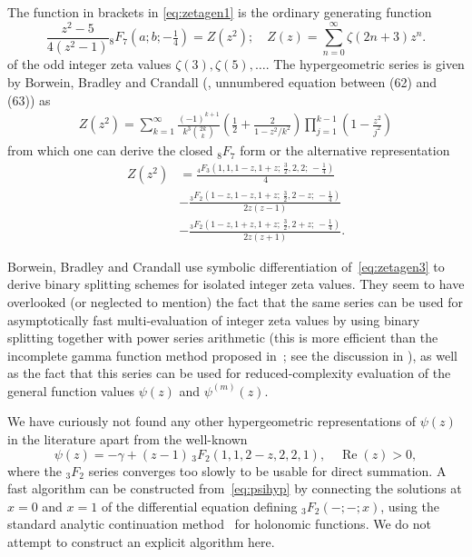 \documentclass[reqno]{amsart}
\newcommand{\Real}{\operatorname{Re}}
\theoremstyle{definition}
\begin{document}
The function in brackets in \eqref{eq:zetagen1} is
the ordinary generating function 
\begin{equation}
\frac{z^2-5}{4 (z^2-1)} {}_8F_7 ( a; b; -\tfrac{1}{4} ) = Z(z^2); \quad Z(z) = \sum_{n=0}^{\infty} \zeta(2n+3) z^n.
\label{eq:zetagen2}
\end{equation}
of the odd integer zeta values $\zeta(3), \zeta(5), \ldots$.
The hypergeometric series is given by
Borwein, Bradley and Crandall (\cite{BorweinBradleyCrandall2000}, unnumbered equation between (62) and (63))
as
\begin{align}
Z(z^2) = \sum_{k=1}^{\infty} \frac{(-1)^{k+1}}{k^3 {2k \choose k}} \left(\frac{1}{2} + \frac{2}{1-z^2/k^2}\right) \prod_{j=1}^{k-1} \left(1 - \frac{z^2}{j^2} \right)
\label{eq:zetagen3}
\end{align}
from which one can derive the closed ${}_8F_7$ form or the alternative representation
\begin{align}
Z(z^2) & = \frac{{}_4F_3(1, 1, 1-z, 1+z;\, \tfrac{3}{2}, 2, 2;\, -\tfrac{1}{4})}{4} \\
       & - \frac{{}_3F_2(1-z, 1-z, 1+z;\, \tfrac{3}{2}, 2-z;\, -\tfrac{1}{4})}{2 z (z-1)} \\
       & - \frac{{}_3F_2(1-z, 1+z, 1+z;\, \tfrac{3}{2}, 2+z;\, -\tfrac{1}{4})}{2 z (z+1)}.
\end{align}

Borwein, Bradley and Crandall use symbolic differentiation of~\eqref{eq:zetagen3}
to derive binary splitting schemes for isolated integer zeta values.
They seem to have overlooked (or neglected to mention)
the fact that the same series can be used for asymptotically fast
multi-evaluation of integer zeta values
by using binary splitting together with power series arithmetic
(this is more efficient than the incomplete gamma function method proposed in~{\cite{BorweinBradleyCrandall2000}};
see the discussion in \cite{Johansson2014thesis}),
as well as the fact that
this series can be used for reduced-complexity evaluation of the general function values $\psi(z)$ and $\psi^{(m)}(z)$.

We have curiously not found any other hypergeometric
representations of $\psi(z)$ in the literature
apart from the well-known
\begin{equation}
\psi(z) = -\gamma + \left(z - 1\right) \,{}_3F_2(1, 1, 2 - z, 2, 2, 1), \quad \Real(z) > 0,
\label{eq:psihyp}
\end{equation}
where the ${}_3F_2$ series converges too slowly to
be usable for direct summation.
A fast algorithm can be constructed from~\eqref{eq:psihyp} 
by connecting the solutions at $x = 0$ and $x = 1$ of the differential
equation defining ${}_3F_2(-;-;x)$,
using the standard analytic continuation
method~\cite{vdH:hol,Mezzarobba2011} for holonomic functions.
We do not attempt to construct an explicit algorithm here.
\end{document}
